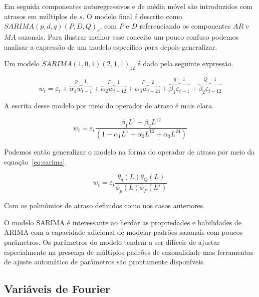 Em seguida componentes autoregressivos e de média móvel são introduzidos com
atrasos em múltiplos de $s$. O modelo final é descrito como $SARIMA(p, d, q)
(P, D, Q)_{s}$, com $P$ e $D$ referenciando os componentes $AR$ e $MA$
sazonais. Para ilustrar melhor esse conceito um pouco confuso podemos analisar a
expressão de um modelo específico para depois generalizar.

Um modelo $SARIMA(1, 0, 1)(2, 1, 1)_{12}$ é dado pela seguinte expressão.

$$ w_t = \varepsilon_t + \overbrace{\alpha_1 w_{t-1}}^{p = 1} + \overbrace{
\alpha_2 w_{t-12}}^{P=1} + \overbrace{\alpha_3 w_{t-24}}^{P=2} +
\overbrace{\beta_1 \varepsilon_{t-1}}^{q=1} + \overbrace{\beta_2
\varepsilon_{t-12}}^{Q=1}$$

A escrita desse modelo por meio do operador de atraso é mais clara.

$$  w_t = \varepsilon_t \frac{\beta_1 L^1 + \beta_2 L^{12}}{(1 - \alpha_1 L^1 + \alpha_2 L^{12} + \alpha_3 L^{24})}  $$

Podemos então generalizar o modelo na forma do operador de atraso por meio da
equação~\ref{eq:sarima}.

\begin{equation}\label{eq:sarima}
    w_t = \varepsilon_{t} \frac{\theta_q(L)\theta_Q(L)}{\phi_p (L) \phi_P (L^s)}
\end{equation}

Com os polinômios de atraso definidos como nos casos anteriores.

O modelo SARIMA é interessante ao herdar as propriedades e habilidades de
ARIMA com a capacidade adicional de modelar padrões sazonais com poucos
parâmetros. Os parâmetros do modelo tendem a ser difíceis de ajustar
especialmente na presença de múltiplos padrões de sazonalidade mas ferramentas
de ajuste automático de parâmetros são prontamente disponíveis.

\subsection{Variáveis de Fourier}
